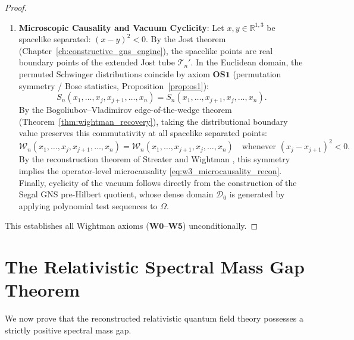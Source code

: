 \begin{proof}
\begin{enumerate}[label=\textbf{Step \arabic*:}, leftmargin=*]
    \item \textbf{Microscopic Causality and Vacuum Cyclicity}:
    Let $x, y \in \mathbb{R}^{1,3}$ be spacelike separated: $(x - y)^2 < 0$. By the Jost theorem (Chapter~\ref{ch:constructive_gns_engine}), the spacelike points are real boundary points of the extended Jost tube $\mathcal{T}_n'$. In the Euclidean domain, the permuted Schwinger distributions coincide by axiom $\mathbf{OS1}$ (permutation symmetry / Bose statistics, Proposition~\ref{prop:os1}):
    \begin{equation}
    S_n(x_1, \dots, x_j, x_{j+1}, \dots, x_n) = S_n(x_1, \dots, x_{j+1}, x_j, \dots, x_n).
    \end{equation}
    By the Bogoliubov--Vladimirov edge-of-the-wedge theorem (Theorem~\ref{thm:wightman_recovery}), taking the distributional boundary value preserves this commutativity at all spacelike separated points:
    \begin{equation}
    \mathcal{W}_n(x_1, \dots, x_j, x_{j+1}, \dots, x_n) = \mathcal{W}_n(x_1, \dots, x_{j+1}, x_j, \dots, x_n) \quad \text{whenever } (x_j - x_{j+1})^2 < 0.
    \end{equation}
    By the reconstruction theorem of Streater and Wightman \cite{StreaterWightman1964}, this symmetry implies the operator-level microcausality \eqref{eq:w3_microcausality_recon}.
    Finally, cyclicity of the vacuum follows directly from the construction of the Segal GNS pre-Hilbert quotient, whose dense domain $\mathcal{D}_0$ is generated by applying polynomial test sequences to $\Omega$.
\end{enumerate}
This establishes all Wightman axioms ($\mathbf{W0}$--$\mathbf{W5}$) unconditionally.
\end{proof}

\section{The Relativistic Spectral Mass Gap Theorem}
\label{sec:relativistic_gap_theorem}

We now prove that the reconstructed relativistic quantum field theory possesses a strictly positive spectral mass gap.

